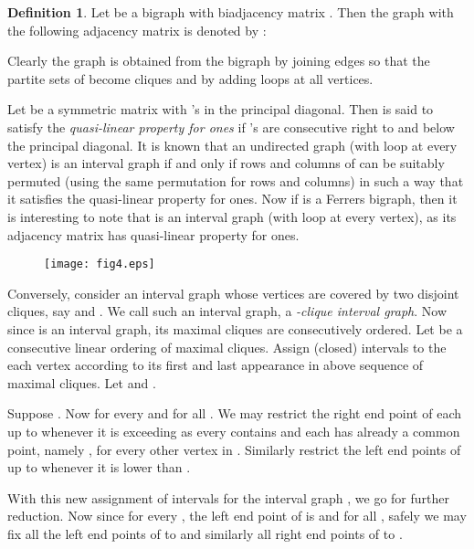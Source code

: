 \documentclass[11pt]{article}
\theoremstyle{definition}
\newtheorem{defn}[thm]{Definition}
\theoremstyle{remark}
\numberwithin{equation}{section}
\begin{document}
\begin{defn} 
Let  be a bigraph with biadjacency matrix . Then the graph with the following adjacency matrix is denoted by :

Clearly the graph  is obtained from the bigraph  by joining edges so that the partite sets of  become cliques and by adding loops at all vertices.
\end{defn}

Let  be a symmetric  matrix with 's in the principal diagonal. Then  is said to satisfy the {\em quasi-linear property for ones} if 's are consecutive right to and below the principal diagonal. It is known \cite{M} that an undirected graph  (with loop at every vertex) is an interval graph if and only if rows and columns of  can be suitably permuted (using the same permutation for rows and columns) in such a way that it satisfies the quasi-linear property for ones. Now if  is a Ferrers bigraph, then it is interesting to note that  is an interval graph (with loop at every vertex), as its adjacency matrix has quasi-linear property for ones.

\begin{figure}[h]
\begin{center}
\texttt{[image: fig4.eps]}
\end{center}
\end{figure}

Conversely, consider an interval graph  whose vertices are covered by two disjoint cliques, say  and . We call such an interval graph, a {\em -clique interval graph}. Now since  is an interval graph, its maximal cliques are consecutively ordered. Let  be a consecutive linear ordering of maximal cliques. Assign (closed) intervals  to the each vertex  according to its first and last appearance in above sequence of maximal cliques. Let  and . 

\vspace{1em} Suppose . Now for every  and for all . We may restrict the right end point of each  up to  whenever it is exceeding  as every  contains  and each  has already a common point, namely , for every other vertex in . Similarly restrict the left end points of  up to  whenever it is lower than . 

\vspace{1em} With this new assignment of intervals for the interval graph , we go for further reduction. Now since for every , the left end point of  is  and  for all , safely we may fix all the left end points of  to  and similarly all right end points of  to .
\end{document}
